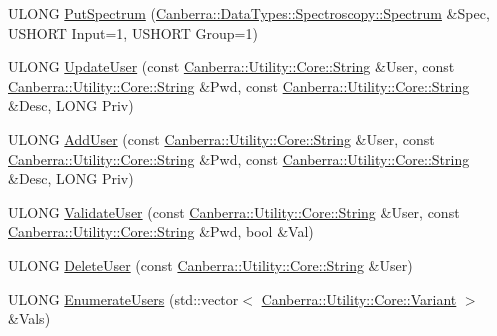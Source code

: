 \begin{DoxyCompactItemize}
\item 
U\+L\+O\+NG \hyperlink{class_canberra_1_1_protocols_1_1_lynx_1_1_device_a5aa231963ff4d259fd1b100c6f620490_a5aa231963ff4d259fd1b100c6f620490}{Put\+Spectrum} (\hyperlink{class_canberra_1_1_data_types_1_1_spectroscopy_1_1_spectrum}{Canberra\+::\+Data\+Types\+::\+Spectroscopy\+::\+Spectrum} \&Spec, U\+S\+H\+O\+RT Input=1, U\+S\+H\+O\+RT Group=1)
\item 
U\+L\+O\+NG \hyperlink{class_canberra_1_1_protocols_1_1_lynx_1_1_device_a47051ab0ec0a01f2b0f56925d12d10df_a47051ab0ec0a01f2b0f56925d12d10df}{Update\+User} (const \hyperlink{class_canberra_1_1_utility_1_1_core_1_1_string}{Canberra\+::\+Utility\+::\+Core\+::\+String} \&User, const \hyperlink{class_canberra_1_1_utility_1_1_core_1_1_string}{Canberra\+::\+Utility\+::\+Core\+::\+String} \&Pwd, const \hyperlink{class_canberra_1_1_utility_1_1_core_1_1_string}{Canberra\+::\+Utility\+::\+Core\+::\+String} \&Desc, L\+O\+NG Priv)
\item 
U\+L\+O\+NG \hyperlink{class_canberra_1_1_protocols_1_1_lynx_1_1_device_a08a8d92f4b2ae149f92c9b4f2fa62dee_a08a8d92f4b2ae149f92c9b4f2fa62dee}{Add\+User} (const \hyperlink{class_canberra_1_1_utility_1_1_core_1_1_string}{Canberra\+::\+Utility\+::\+Core\+::\+String} \&User, const \hyperlink{class_canberra_1_1_utility_1_1_core_1_1_string}{Canberra\+::\+Utility\+::\+Core\+::\+String} \&Pwd, const \hyperlink{class_canberra_1_1_utility_1_1_core_1_1_string}{Canberra\+::\+Utility\+::\+Core\+::\+String} \&Desc, L\+O\+NG Priv)
\item 
U\+L\+O\+NG \hyperlink{class_canberra_1_1_protocols_1_1_lynx_1_1_device_aa5895622f6c9b7006da39245302d3a4a_aa5895622f6c9b7006da39245302d3a4a}{Validate\+User} (const \hyperlink{class_canberra_1_1_utility_1_1_core_1_1_string}{Canberra\+::\+Utility\+::\+Core\+::\+String} \&User, const \hyperlink{class_canberra_1_1_utility_1_1_core_1_1_string}{Canberra\+::\+Utility\+::\+Core\+::\+String} \&Pwd, bool \&Val)
\item 
U\+L\+O\+NG \hyperlink{class_canberra_1_1_protocols_1_1_lynx_1_1_device_a3e7d53d8358f59ac34c6d69fe97a200c_a3e7d53d8358f59ac34c6d69fe97a200c}{Delete\+User} (const \hyperlink{class_canberra_1_1_utility_1_1_core_1_1_string}{Canberra\+::\+Utility\+::\+Core\+::\+String} \&User)
\item 
U\+L\+O\+NG \hyperlink{class_canberra_1_1_protocols_1_1_lynx_1_1_device_a62e3acd5c9efc70381c37ea94060d648_a62e3acd5c9efc70381c37ea94060d648}{Enumerate\+Users} (std\+::vector$<$ \hyperlink{class_canberra_1_1_utility_1_1_core_1_1_variant}{Canberra\+::\+Utility\+::\+Core\+::\+Variant} $>$ \&Vals)

\end{DoxyCompactItemize}

